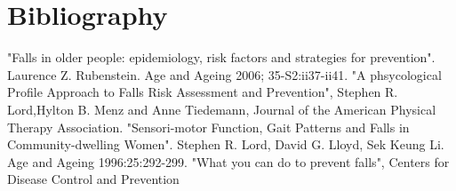 \section{Bibliography}
\begin{thebibliography}{99}


"Falls in older people: epidemiology, risk factors and strategies for prevention". Laurence Z. Rubenstein. Age and Ageing 2006; 35-S2:ii37-ii41.
"A phsycological Profile Approach to Falls Risk Assessment and Prevention", Stephen R. Lord,Hylton B. Menz and Anne Tiedemann, Journal of the American Physical Therapy Association. 
"Sensori-motor Function, Gait Patterns and Falls in Community-dwelling Women". Stephen R. Lord, David G. Lloyd, Sek Keung Li. Age and Ageing 1996:25:292-299.
  "What you can do to prevent falls", Centers for Disease Control and Prevention
  
\end{thebibliography}